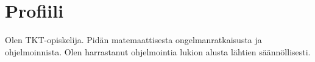 \section*{Profiili}

Olen TKT-opiskelija. Pidän matemaattisesta ongelmanratkaisusta ja
ohjelmoinnista. Olen harrastanut ohjelmointia lukion alusta lähtien
säännöllisesti.
